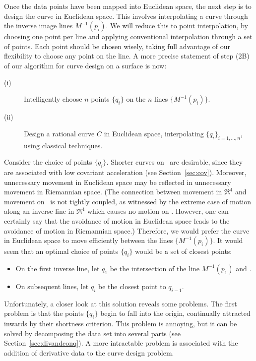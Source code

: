 Once the data points have been mapped into Euclidean space,
the next step is to design the curve in Euclidean space.
This involves interpolating a curve through the 
inverse image lines $M^{-1}(p_i)$.
We will reduce this to point interpolation, 
by choosing one point per line
and applying conventional interpolation through a set of points.
Each point should be chosen wisely, taking full advantage of our
flexibility to choose any point on the line.
A more precise statement of step (2B) of our algorithm
for curve design on a surface is now:
%
\begin{description}
\item[(i)] 
	Intelligently choose $n$ points
	$\{q_i\}$ on the $n$ lines $\{M^{-1}(p_i)\}$.
\item[(ii)]
	Design a rational curve $C$ in Euclidean space,
	interpolating $\{q_i\}_{i=1,\ldots,n}$, using classical techniques.
\end{description}

Consider the choice of points $\{q_i\}$.
Shorter curves on \ are
desirable, since they are associated with low covariant
acceleration (see Section~\ref{sec:cov}).
Moreover, unnecessary movement in Euclidean space
may be reflected in unnecessary movement in Riemannian space.
(The connection between movement in $\Re^4$ and movement on \ 
is not tightly coupled, as witnessed by the extreme case of motion along
an inverse line in $\Re^4$ which causes no motion on \Sn{3}.
However, one can certainly
say that the avoidance of motion in Euclidean space leads to the avoidance
of motion in Riemannian space.)
Therefore, we would prefer the curve in Euclidean space to move
efficiently between the lines $\{M^{-1}(p_i)\}$.
It would seem that an optimal choice of points	
$\{q_i\}$ would be a set of closest points:
	
\begin{itemize}
\item On the first inverse line, let $q_1$ be the intersection
of the line $M^{-1}(p_1)$ and .
\item On subsequent lines, let $q_i$ be the closest point to $q_{i-1}$.
\end{itemize}

Unfortunately, a closer look at this solution reveals some problems.
The first problem is that the points $\{q_i\}$ begin to fall
into the origin, continually attracted inwards by their shortness criterion.
This problem is annoying, but it can be solved by decomposing
the data set into several parts (see Section~\ref{sec:divandconq}).
A more intractable problem is associated with the addition of derivative
data to the curve design problem.

